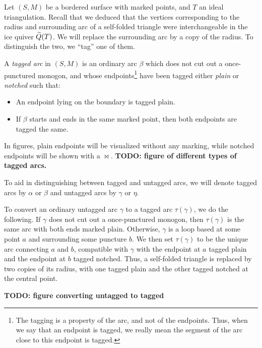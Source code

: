\medskip

Let $(S, M)$ be a bordered surface with marked points, and $T$ an ideal triangulation.
Recall that we deduced that the vertices corresponding to the radius and surrounding
arc of a self-folded triangle were interchangeable in the ice quiver $\widetilde{Q}(T)$. We will
replace the surrounding arc by a copy of the radius. To distinguish the two, we ``tag''
one of them.

\begin{definition}

	A \emph{tagged arc} in $(S, M)$ is an ordinary arc $\beta$ which does
	not cut out a once-punctured monogon, and whose endpoints\footnote{The tagging is a
		property of the arc, and not of the endpoints. Thus, when we say that an endpoint is
		tagged, we really mean the segment of the arc close to this endpoint is tagged.} have
	been tagged either \emph{plain} or \emph{notched}
	such that:
	\begin{itemize}
		\item An endpoint lying on the boundary is tagged plain.
		\item If $\beta$ starts and ends in the same marked point, then both endpoints are tagged the
		      same.
	\end{itemize}
	In figures, plain endpoints will be visualized without any marking, while notched
	endpoints will be shown with a $\bowtie$. \textbf{TODO: figure
		of different types of tagged arcs.}

	To aid in distinguishing between tagged and untagged arcs, we will denote tagged arcs
	by $\alpha$ or $\beta$ and untagged arcs by $\gamma$ or $\eta$.
\end{definition}

To convert an ordinary untagged arc $\gamma$ to a tagged arc $\tau(\gamma)$, we do the
following. If $\gamma$ does not cut out a once-punctured monogon, then $\tau(\gamma)$
is the same arc with both ends marked plain. Otherwise, $\gamma$ is a loop based at
some point $a$ and surrounding some puncture $b$. We then set $\tau(\gamma)$ to be the
unique arc connecting $a$ and $b$, compatible with $\gamma$ with the endpoint at $a$
tagged plain and the endpoint at $b$ tagged notched. Thus, a self-folded triangle is
replaced by two copies of its radius, with one tagged plain and the other tagged
notched at the central point.

\textbf{TODO: figure converting untagged to tagged}

